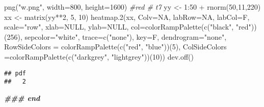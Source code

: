 \documentclass[
]{article}
\newenvironment{Shaded}{\begin{snugshade}}{\end{snugshade}}
\newcommand{\AttributeTok}[1]{\textcolor[rgb]{0.77,0.63,0.00}{#1}}
\newcommand{\CommentTok}[1]{\textcolor[rgb]{0.56,0.35,0.01}{\textit{#1}}}
\newcommand{\ConstantTok}[1]{\textcolor[rgb]{0.00,0.00,0.00}{#1}}
\newcommand{\DecValTok}[1]{\textcolor[rgb]{0.00,0.00,0.81}{#1}}
\newcommand{\DocumentationTok}[1]{\textcolor[rgb]{0.56,0.35,0.01}{\textbf{\textit{#1}}}}
\newcommand{\FunctionTok}[1]{\textcolor[rgb]{0.00,0.00,0.00}{#1}}
\newcommand{\NormalTok}[1]{#1}
\newcommand{\OtherTok}[1]{\textcolor[rgb]{0.56,0.35,0.01}{#1}}
\newcommand{\SpecialCharTok}[1]{\textcolor[rgb]{0.00,0.00,0.00}{#1}}
\newcommand{\StringTok}[1]{\textcolor[rgb]{0.31,0.60,0.02}{#1}}
\begin{document}
\begin{Shaded}
\begin{Highlighting}[]
\FunctionTok{png}\NormalTok{(}\StringTok{"w.png"}\NormalTok{, }\AttributeTok{width=}\DecValTok{800}\NormalTok{, }\AttributeTok{height=}\DecValTok{1600}\NormalTok{) }\CommentTok{\#red \# t7}
\NormalTok{yy }\OtherTok{\textless{}{-}} \DecValTok{1}\SpecialCharTok{:}\DecValTok{50} \SpecialCharTok{+} \FunctionTok{rnorm}\NormalTok{(}\DecValTok{50}\NormalTok{,}\DecValTok{11}\NormalTok{,}\DecValTok{220}\NormalTok{)}
\NormalTok{xx }\OtherTok{\textless{}{-}} \FunctionTok{matrix}\NormalTok{(yy}\SpecialCharTok{**}\DecValTok{2}\NormalTok{, }\DecValTok{5}\NormalTok{, }\DecValTok{10}\NormalTok{)}
\FunctionTok{heatmap.2}\NormalTok{(xx, }\AttributeTok{Colv=}\ConstantTok{NA}\NormalTok{, }\AttributeTok{labRow=}\ConstantTok{NA}\NormalTok{, }\AttributeTok{labCol=}\NormalTok{F, }\AttributeTok{scale=}\StringTok{"row"}\NormalTok{, }\AttributeTok{xlab=}\ConstantTok{NULL}\NormalTok{,}
          \AttributeTok{ylab=}\ConstantTok{NULL}\NormalTok{, }\AttributeTok{col=}\FunctionTok{colorRampPalette}\NormalTok{(}\FunctionTok{c}\NormalTok{(}\StringTok{"black"}\NormalTok{, }\StringTok{"red"}\NormalTok{))(}\DecValTok{256}\NormalTok{),  }
        \AttributeTok{sepcolor=}\StringTok{"white"}\NormalTok{, }\AttributeTok{trace=}\FunctionTok{c}\NormalTok{(}\StringTok{"none"}\NormalTok{), }\AttributeTok{key=}\NormalTok{F, }\AttributeTok{dendrogram=}\StringTok{"none"}\NormalTok{,}
        \AttributeTok{RowSideColors =} \FunctionTok{colorRampPalette}\NormalTok{(}\FunctionTok{c}\NormalTok{(}\StringTok{"red"}\NormalTok{, }\StringTok{"blue"}\NormalTok{))(}\DecValTok{5}\NormalTok{),}
        \AttributeTok{ColSideColors =}\FunctionTok{colorRampPalette}\NormalTok{(}\FunctionTok{c}\NormalTok{(}\StringTok{"darkgrey"}\NormalTok{, }\StringTok{"lightgrey"}\NormalTok{))(}\DecValTok{10}\NormalTok{))}
\FunctionTok{dev.off}\NormalTok{()}
\end{Highlighting}
\end{Shaded}

\begin{verbatim}
## pdf 
##   2
\end{verbatim}

\begin{Shaded}
\begin{Highlighting}[]
\DocumentationTok{\#\#\# end}
\end{Highlighting}
\end{Shaded}
\end{document}

